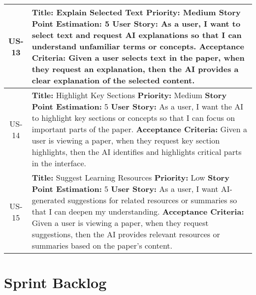 \documentclass[12pt]{article}
\begin{document}
\begin{longtable}{|c|p{15cm}|}
  \hline
  US-13 &
  \textbf{Title:} Explain Selected Text \newline
  \textbf{Priority:} Medium \newline
  \textbf{Story Point Estimation:} 5 \newline
  \textbf{User Story:} As a user, I want to select text and request AI explanations so that I can understand unfamiliar terms or concepts. \newline
  \textbf{Acceptance Criteria:} Given a user selects text in the paper, when they request an explanation, then the AI provides a clear explanation of the selected content. \\

  \hline
  US-14 &
  \textbf{Title:} Highlight Key Sections \newline
  \textbf{Priority:} Medium \newline
  \textbf{Story Point Estimation:} 5 \newline
  \textbf{User Story:} As a user, I want the AI to highlight key sections or concepts so that I can focus on important parts of the paper. \newline
  \textbf{Acceptance Criteria:} Given a user is viewing a paper, when they request key section highlights, then the AI identifies and highlights critical parts in the interface. \\

  \hline
  US-15 &
  \textbf{Title:} Suggest Learning Resources \newline
  \textbf{Priority:} Low \newline
  \textbf{Story Point Estimation:} 5 \newline
  \textbf{User Story:} As a user, I want AI-generated suggestions for related resources or summaries so that I can deepen my understanding. \newline
  \textbf{Acceptance Criteria:} Given a user is viewing a paper, when they request suggestions, then the AI provides relevant resources or summaries based on the paper's content. \\

  \hline
\end{longtable}

\section{Sprint Backlog}
\label{sec:sprint-backlog}
\end{document}
